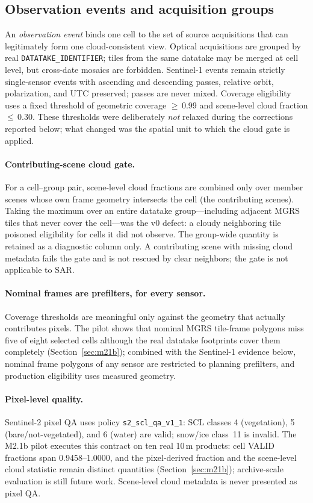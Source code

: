 

\subsection{Observation events and acquisition groups}
An \emph{observation event} binds one cell to the set of source
acquisitions that can legitimately form one cloud-consistent view.
Optical acquisitions are grouped by real \texttt{DATATAKE\_IDENTIFIER};
tiles from the same datatake may be merged at cell level, but cross-date
mosaics are forbidden. Sentinel-1 events remain strictly single-sensor
events with ascending and descending passes, relative orbit,
polarization, and UTC preserved; passes are never mixed. Coverage
eligibility uses a fixed threshold of geometric coverage
$\ge$\,0.99 and scene-level cloud fraction $\le$\,0.30. These
thresholds were deliberately \emph{not} relaxed during the corrections
reported below; what changed was the spatial unit to which the cloud
gate is applied.

\paragraph{Contributing-scene cloud gate.} For a cell--group pair,
scene-level cloud fractions are combined only over member scenes whose
own frame geometry intersects the cell (the contributing scenes).
Taking the maximum over an entire datatake group---including adjacent
MGRS tiles that never cover the cell---was the v0 defect: a cloudy
neighboring tile poisoned eligibility for cells it did not observe. The
group-wide quantity is retained as a diagnostic column only. A
contributing scene with missing cloud metadata fails the gate and is
not rescued by clear neighbors; the gate is not applicable to SAR.

\paragraph{Nominal frames are prefilters, for every sensor.}
Coverage thresholds are meaningful only against the geometry that
actually contributes pixels. The pilot shows that nominal MGRS
tile-frame polygons miss five of eight selected cells although the
real datatake footprints cover them completely
(Section~\ref{sec:m21b}); combined with the Sentinel-1 evidence
below, nominal frame polygons of any sensor are restricted to
planning prefilters, and production eligibility uses measured
geometry.

\paragraph{Pixel-level quality.} Sentinel-2 pixel QA uses policy
\texttt{s2\_scl\_qa\_v1\_1}: SCL classes 4 (vegetation), 5
(bare/not-vegetated), and 6 (water) are valid; snow/ice class~11 is
invalid. The M2.1b pilot executes this contract on ten real 10\,m
products: cell VALID fractions span 0.9458--1.0000, and the
pixel-derived fraction and the scene-level cloud statistic remain
distinct quantities (Section~\ref{sec:m21b}); archive-scale
evaluation is still future work. Scene-level cloud metadata is never
presented as pixel QA.

